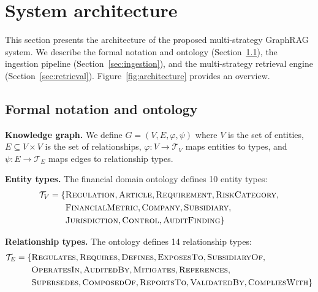 \documentclass[review]{elsarticle}
\begin{document}
\section{System architecture}
\label{sec:architecture}

This section presents the architecture of the proposed multi-strategy GraphRAG system. We describe the formal notation and ontology (Section~\ref{sec:notation}), the ingestion pipeline (Section~\ref{sec:ingestion}), and the multi-strategy retrieval engine (Section~\ref{sec:retrieval}). Figure~\ref{fig:architecture} provides an overview.

\subsection{Formal notation and ontology}
\label{sec:notation}

\textbf{Knowledge graph.} We define $G = (V, E, \varphi, \psi)$ where $V$ is the set of entities, $E \subseteq V \times V$ is the set of relationships, $\varphi: V \rightarrow \mathcal{T}_V$ maps entities to types, and $\psi: E \rightarrow \mathcal{T}_E$ maps edges to relationship types.

\textbf{Entity types.} The financial domain ontology defines 10 entity types:
\begin{equation}
\begin{split}
\mathcal{T}_V = \{&\textsc{Regulation}, \textsc{Article}, \textsc{Requirement}, \textsc{RiskCategory}, \\
&\textsc{FinancialMetric}, \textsc{Company}, \textsc{Subsidiary}, \\
&\textsc{Jurisdiction}, \textsc{Control}, \textsc{AuditFinding}\}
\end{split}
\end{equation}

\textbf{Relationship types.} The ontology defines 14 relationship types:
\begin{equation}
\begin{split}
\mathcal{T}_E = \{&\textsc{Regulates}, \textsc{Requires}, \textsc{Defines}, \textsc{ExposesTo}, \textsc{SubsidiaryOf}, \\
&\textsc{OperatesIn}, \textsc{AuditedBy}, \textsc{Mitigates}, \textsc{References}, \\
&\textsc{Supersedes}, \textsc{ComposedOf}, \textsc{ReportsTo}, \textsc{ValidatedBy}, \textsc{CompliesWith}\}
\end{split}
\end{equation}
\end{document}
